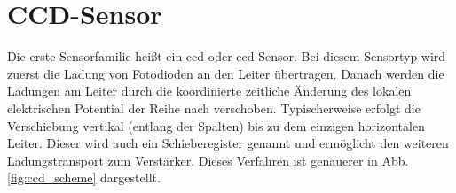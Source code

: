 \section{CCD-Sensor}
\label{text:ccd_theorie}
Die erste Sensorfamilie heißt ein \gls{ccd} oder \gls{ccd}-Sensor. Bei diesem Sensortyp wird zuerst die Ladung von Fotodioden an den Leiter übertragen. Danach werden die Ladungen am Leiter durch die koordinierte zeitliche Änderung des lokalen elektrischen Potential der Reihe nach verschoben. Typischerweise erfolgt die Verschiebung vertikal (entlang der Spalten) bis zu dem einzigen horizontalen Leiter. Dieser wird auch ein Schieberegister genannt und ermöglicht den weiteren Ladungstransport zum Verstärker. Dieses Verfahren ist genauerer in Abb. \ref{fig:ccd_scheme} dargestellt.
\begin{figure}[H]
    \centering

\end{figure}
